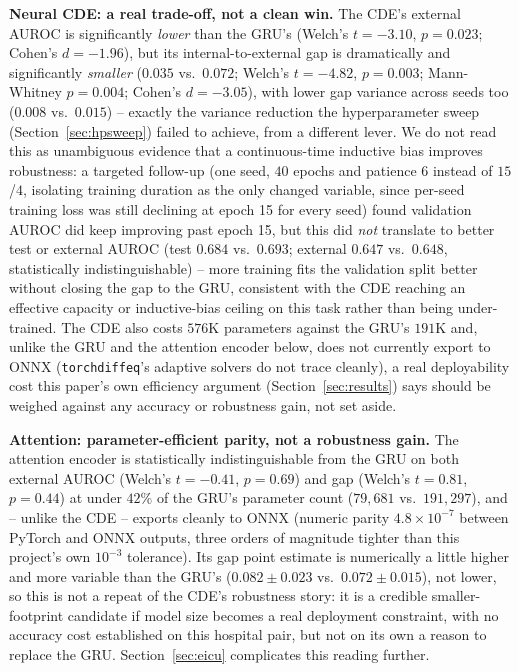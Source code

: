 \documentclass[11pt]{article}
\begin{document}
\textbf{Neural CDE: a real trade-off, not a clean win.} The CDE's external AUROC is significantly \emph{lower} than the GRU's (Welch's $t=-3.10$, $p=0.023$; Cohen's $d=-1.96$), but its internal-to-external gap is dramatically and significantly \emph{smaller} ($0.035$ vs.\ $0.072$; Welch's $t=-4.82$, $p=0.003$; Mann-Whitney $p=0.004$; Cohen's $d=-3.05$), with lower gap variance across seeds too ($0.008$ vs.\ $0.015$) -- exactly the variance reduction the hyperparameter sweep (Section~\ref{sec:hpsweep}) failed to achieve, from a different lever. We do not read this as unambiguous evidence that a continuous-time inductive bias improves robustness: a targeted follow-up (one seed, $40$ epochs and patience $6$ instead of $15$/$4$, isolating training duration as the only changed variable, since per-seed training loss was still declining at epoch 15 for every seed) found validation AUROC did keep improving past epoch 15, but this did \emph{not} translate to better test or external AUROC (test $0.684$ vs.\ $0.693$; external $0.647$ vs.\ $0.648$, statistically indistinguishable) -- more training fits the validation split better without closing the gap to the GRU, consistent with the CDE reaching an effective capacity or inductive-bias ceiling on this task rather than being under-trained. The CDE also costs $576$K parameters against the GRU's $191$K and, unlike the GRU and the attention encoder below, does not currently export to ONNX (\texttt{torchdiffeq}'s adaptive solvers do not trace cleanly), a real deployability cost this paper's own efficiency argument (Section~\ref{sec:results}) says should be weighed against any accuracy or robustness gain, not set aside.

\textbf{Attention: parameter-efficient parity, not a robustness gain.} The attention encoder is statistically indistinguishable from the GRU on both external AUROC (Welch's $t=-0.41$, $p=0.69$) and gap (Welch's $t=0.81$, $p=0.44$) at under $42\%$ of the GRU's parameter count ($79{,}681$ vs.\ $191{,}297$), and -- unlike the CDE -- exports cleanly to ONNX (numeric parity $4.8\times10^{-7}$ between PyTorch and ONNX outputs, three orders of magnitude tighter than this project's own $10^{-3}$ tolerance). Its gap point estimate is numerically a little higher and more variable than the GRU's ($0.082\pm0.023$ vs.\ $0.072\pm0.015$), not lower, so this is not a repeat of the CDE's robustness story: it is a credible smaller-footprint candidate if model size becomes a real deployment constraint, with no accuracy cost established on this hospital pair, but not on its own a reason to replace the GRU. Section~\ref{sec:eicu} complicates this reading further.
\end{document}
